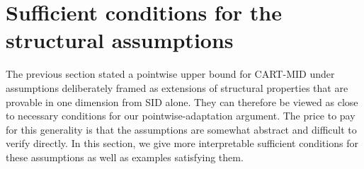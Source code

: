 \documentclass[11pt]{article}
\theoremstyle{plain}
\theoremstyle{definition}
\theoremstyle{remark}
\theoremstyle{plain}
\newcommand{\bx}{\mathbf{x}}
\newcommand{\1}{\mathbbm{1}}
\begin{document}





\section{Sufficient conditions for the structural assumptions}
\label{section:special}

The previous section stated a pointwise upper bound for CART-MID under assumptions deliberately framed as extensions of structural properties that are provable in one dimension from SID alone.
They can therefore be viewed as close to necessary conditions for our pointwise-adaptation argument.
The price to pay for this generality is that the assumptions are somewhat abstract and difficult to verify directly.
In this section, we give more interpretable sufficient conditions for these assumptions as well as examples satisfying them.
\end{document}
